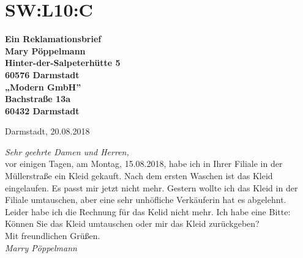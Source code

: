 \section{SW:L10:C}
\noindent
\textbf{Ein Reklamationsbrief}  \\
\textbf{Mary Pöppelmann \\ Hinter-der-Salpeterhütte 5 \\ 60576 Darmstadt}  \\
\textbf{„Modern GmbH” \\ Bachstraße 13a \\ 60432 Darmstadt} \\
\begin{flushright}
    Darmstadt, 20.08.2018
\end{flushright}
\noindent
\emph{Sehr geehrte Damen und Herren,} \\
vor einigen Tagen, am Montag, 15.08.2018, habe ich in Ihrer Filiale  in der Müllerstraße ein Kleid gekauft.
Nach dem ersten Waschen ist das Kleid eingelaufen. 
Es passt mir jetzt nicht mehr.
Gestern wollte ich das Kleid in der Filiale umtauschen, aber eine sehr unhöfliche Verkäuferin hat es abgelehnt.  \\
Leider habe ich die Rechnung für das Kelid nicht mehr.
Ich habe eine Bitte: Können Sie das Kleid umtauschen oder mir das Kleid zurückgeben? \\
Mit freundlichen Grüßen. \\
\emph{Marry Pöppelmann}

